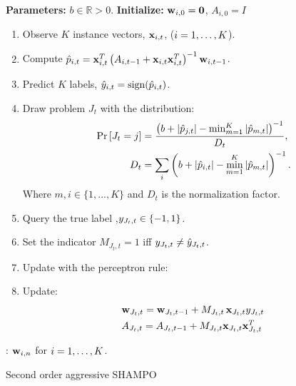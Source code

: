 \begin{algorithm}
\begin{algorithmic}
   \State \textbf{Parameters:}  $b\in\mathbb{R}>0$.
   \State \textbf{Initialize:} $\mathbf{w}_{i,0}={\boldsymbol{0}}$, $A_{i,0}=I$ \\
     \begin{enumerate}
     \nolineskips
     \item Observe $K$ instance vectors, $\mathbf{x}_{i,t}$, ($i=1 , \ldots , K$).
     \item Compute  $\hat{p}_{i,t}=\mathbf{x}_{i,t}^T \left({A_{i,t-1}+\mathbf{x}_{i,t}\mathbf{x}_{i,t}^T}\right)^{-1}\mathbf{w}_{i,t-1}$.
     \item Predict $K$ labels, $\hat{y}_{i,t}={\rm sign}(\hat{p}_{i,t})$.
     \item Draw problem $J_t$  with the distribution:
      \begin{align}
    {\rm Pr}\left[{J_t=j}\right] &=
    \frac{\left({b+\left\vert{\hat{p}_{j,t}}\right\vert-\min_{m=1}^K\left\vert{\hat{p}_{m,t}}\right\vert}\right)^{-1}}{D_{t}},\nonumber\\
    D_t &=\sum_i \left({b+\left\vert{\hat{p}_{i,t}}\right\vert-\min_{m=1}^K\left\vert{\hat{p}_{m,t}}\right\vert}\right)^{-1}. \nonumber
     \end{align}
     Where $m,i\in\{1,...,K\}$ and $D_t$ is the normalization factor. 
  \item Query the true label ,$y_{J_t,t}\in\{-1,1\}$.
  \item Set the indicator $M_{J_t, t}=1$ iff $y_{J_t,t} \neq \hat{y}_{J_t,t}$.
  \item Update with the perceptron rule:     
     \item Update:
     \begin{align}
     &\mathbf{w}_{J_t,t} = \mathbf{w}_{J_t,t-1}+M_{J_t,t}\,  \mathbf{x}_{J_t,t}  y_{J_t,t}\,\label{SO_update}\\
     &A_{J_t,t}=A_{J_t,t-1}+ M_{J_t,t}\mathbf{x}_{J_t,t}\mathbf{x}_{J_t,t}^T\nonumber
     \end{align}
     \end{enumerate}
   \EndFor  
   : $\mathbf{w}_{i,n}$ for $i=1 , \ldots , K$.
\end{algorithmic}
\caption{Second order aggressive SHAMPO }\label{alg:SO_SHAMPO}
\end{algorithm}



